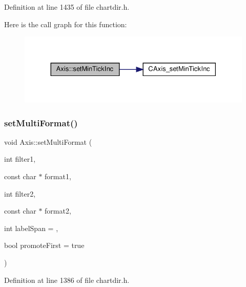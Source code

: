Definition at line 1435 of file chartdir.\+h.

Here is the call graph for this function\+:
\nopagebreak
\begin{figure}[H]
\begin{center}
\leavevmode
\includegraphics[width=330pt]{class_axis_aa3fc0eaec64e538742f6ca74c1540c88_cgraph}
\end{center}
\end{figure}
\mbox{\label{class_axis_a3a6ee98f7c5716c8cb94f325aa8a05d6}} 
\subsubsection{\texorpdfstring{set\+Multi\+Format()}{setMultiFormat()}\hspace{0.1cm}{\footnotesize\ttfamily [1/2]}}
{\footnotesize\ttfamily void Axis\+::set\+Multi\+Format (\begin{DoxyParamCaption}\item[{int}]{filter1,  }\item[{const char $\ast$}]{format1,  }\item[{int}]{filter2,  }\item[{const char $\ast$}]{format2,  }\item[{int}]{label\+Span = {},  }\item[{bool}]{promote\+First = {\ttfamily true} }\end{DoxyParamCaption})\hspace{0.3cm}{\ttfamily [inline]}}



Definition at line 1386 of file chartdir.\+h.

